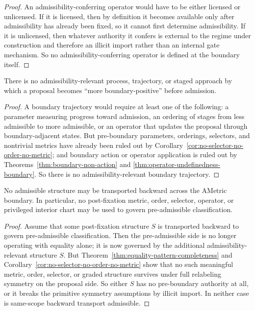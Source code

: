 \begin{proof}
An admissibility-conferring operator would have to be either licensed or unlicensed. If it is licensed, then by definition it becomes available only after admissibility has already been fixed, so it cannot first determine admissibility. If it is unlicensed, then whatever authority it confers is external to the regime under construction and therefore an illicit import rather than an internal gate mechanism. So no admissibility-conferring operator is defined at the boundary itself.\cite{MaleyAMetric,MaleyNecessity}
\end{proof}

\begin{theorem}
\label{thm:no-boundary-trajectory}
There is no admissibility-relevant process, trajectory, or staged approach by which a proposal becomes ``more boundary-positive'' before admission.
\end{theorem}

\begin{proof}
A boundary trajectory would require at least one of the following: a parameter measuring progress toward admission, an ordering of stages from less admissible to more admissible, or an operator that updates the proposal through boundary-adjacent states. But pre-boundary parameters, orderings, selectors, and nontrivial metrics have already been ruled out by Corollary~\ref{cor:no-selector-no-order-no-metric}; and boundary action or operator application is ruled out by Theorems~\ref{thm:boundary-non-action} and \ref{thm:operator-undefinedness-boundary}. So there is no admissibility-relevant boundary trajectory.\cite{MaleyAMetric,MaleyNecessity}
\end{proof}

\begin{theorem}
No admissible structure may be transported backward across the AMetric boundary. In particular, no post-fixation metric, order, selector, operator, or privileged interior chart may be used to govern pre-admissible classification.
\end{theorem}

\begin{proof}
Assume that some post-fixation structure $S$ is transported backward to govern pre-admissible classification. Then the pre-admissible side is no longer operating with equality alone; it is now governed by the additional admissibility-relevant structure $S$. But Theorem~\ref{thm:equality-pattern-completeness} and Corollary~\ref{cor:no-selector-no-order-no-metric} show that no such meaningful metric, order, selector, or graded structure survives under full relabeling symmetry on the proposal side. So either $S$ has no pre-boundary authority at all, or it breaks the primitive symmetry assumptions by illicit import. In neither case is same-scope backward transport admissible.\cite{MaleyAMetric,MaleyNecessity}
\end{proof}


